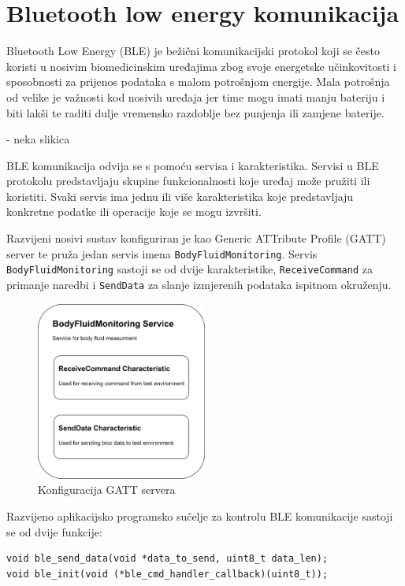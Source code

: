 \documentclass[../diplomski_rad.tex]{subfiles}
\begin{document}
\section{Bluetooth low energy komunikacija}

Bluetooth Low Energy (BLE) je bežični komunikacijski protokol koji se često koristi u 
nosivim biomedicinskim uređajima zbog svoje energetske učinkovitosti i sposobnosti za prijenos podataka s malom potrošnjom energije.
Mala potrošnja od velike je važnosti kod nosivih uređaja jer time mogu imati manju bateriju i biti lakši te raditi dulje vremensko razdoblje 
bez punjenja ili zamjene baterije.

- neka slikica

BLE komunikacija odvija se s pomoću servisa i karakteristika. Servisi u BLE protokolu predstavljaju skupine funkcionalnosti koje 
uređaj može pružiti ili koristiti. Svaki servis ima jednu ili više karakteristika koje predstavljaju konkretne podatke ili operacije koje 
se mogu izvršiti.

Razvijeni nosivi sustav konfiguriran je kao Generic ATTribute Profile (GATT) server te pruža jedan servis imena \texttt{BodyFluidMonitoring}. 
Servis \texttt{BodyFluidMonitoring} sastoji se od dvije karakteristike, \texttt{ReceiveCommand} za primanje naredbi i 
\texttt{SendData} za slanje izmjerenih podataka ispitnom okruženju.

\begin{figure}[htb]
    \centering
    \includegraphics[width=0.5\textwidth]{Figures/ble_service.png} 
    \caption{Konfiguracija GATT servera}
    \label{slk:max_30009_clock}
\end{figure}

Razvijeno aplikacijsko programsko sučelje za kontrolu BLE komunikacije sastoji se od dvije funkcije:
\begin{lstlisting}[label={lst:ble_api},style=CStyle,caption={Programsko sučelje za kontrolu BLE komunikacije},captionpos=b]
void ble_send_data(void *data_to_send, uint8_t data_len);
void ble_init(void (*ble_cmd_handler_callback)(uint8_t));
\end{lstlisting} 
\end{document}
